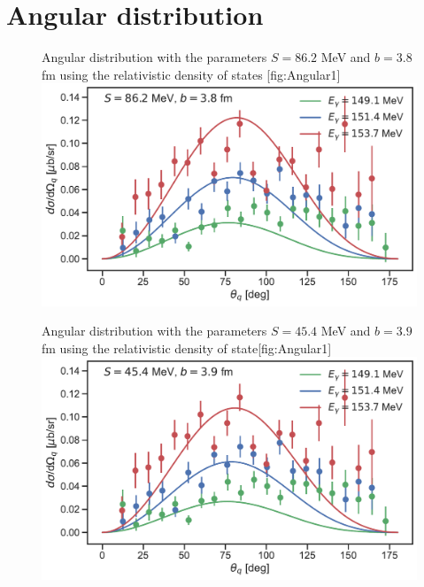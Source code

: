 \chapter{Angular distribution}\label{sec:Angular}
\begin{figure}[H]
	\begin{sidecaption}{Angular distribution with the parameters $S=86.2$ MeV and $b=3.8$ fm using the relativistic density of states }[fig:Angular1]
		\includegraphics[width=\linewidth]{Figures/MultiDiffcross_rel.pdf}
	\end{sidecaption}
\end{figure}
\begin{figure}[H]
	\begin{sidecaption}{Angular distribution with the parameters $S=45.4$ MeV and $b=3.9$ fm using the relativistic density of state}[fig:Angular1]
		\includegraphics[width=\linewidth]{Figures/MultiDiffcross_rel_2.pdf}
	\end{sidecaption}
\end{figure}
